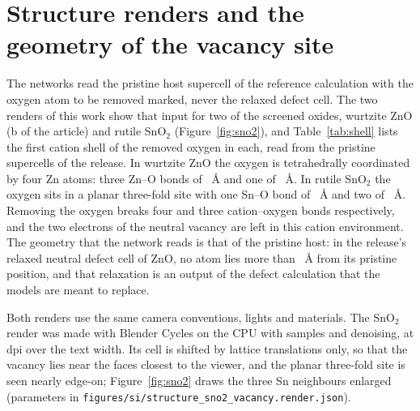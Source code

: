 \section{Structure renders and the geometry of the vacancy site}
\label{si:structures}

The networks read the pristine host supercell of the reference calculation with the oxygen atom to be removed
marked, never the relaxed defect cell. The two renders of this work show that input for two of the screened
oxides, wurtzite ZnO (\artfigoverview{}b of the article) and rutile SnO$_2$
(Figure~\ref{fig:sno2}), and Table~\ref{tab:shell} lists the first cation shell of the removed oxygen in each, read
from the pristine supercells of the release. In wurtzite ZnO the oxygen is tetrahedrally coordinated by four Zn
atoms: three Zn--O bonds of \numRenderZnOFirstShellSeventyFiveDistanceA{}~\AA{} and one of
\numRenderZnOFirstShellZeroDistanceA{}~\AA{}. In rutile SnO$_2$ the oxygen sits in a
planar three-fold site with one Sn--O bond of \numRenderSnOTwoFirstShellZeroDistanceA{}~\AA{} and two of
\numRenderSnOTwoFirstShellEighteenDistanceA{}~\AA{}. Removing the oxygen breaks four and three cation--oxygen bonds respectively, and the
two electrons of the neutral vacancy are left in this cation environment. The
geometry that the network reads is that of the pristine host: in the release's relaxed neutral defect cell of ZnO,
no atom lies more than \numStructureAuditZnoPristineVsRelaxedDisplacementAMaxOfMatchedAtoms{}~\AA{} from its pristine
position, and that relaxation is an output of the defect calculation that the models are meant to replace.

Both renders use the same camera conventions, lights and materials. The SnO$_2$ render was made with Blender
Cycles on the CPU with \numRenderSnOTwoSamples{} samples and denoising, at \numRenderSnOTwoDpi{} dpi over the text
width. Its cell is shifted by lattice translations only, so that the vacancy lies near the faces closest to the
viewer, and the planar three-fold site is seen nearly edge-on; Figure~\ref{fig:sno2} draws the three Sn neighbours
enlarged (parameters in \texttt{figures/si/structure\_sno2\_vacancy.render.json}).

\begin{table}[htbp]
\caption{First cation shell of the removed oxygen in the two rendered hosts (pristine PBEsol(+$U$) supercells of
the release). Atoms: atoms of the supercell; vacancy atom: index of the removed oxygen in the supercell; bond
cutoff: the cation--oxygen distance below which a bond is drawn in the renders. Sources:
\texttt{figures/main/fig1\_zno\_vacancy.render.json} and \texttt{figures/si/structure\_sno2\_vacancy.render.json}
(\texttt{first\_shell}).}
\label{tab:shell}
\centering\small

\end{table}

